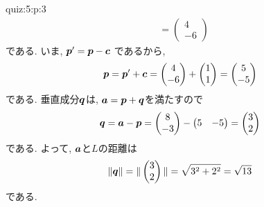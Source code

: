 \begin{answerof}{quiz:5:p:3}
\begin{align*}
  &=\begin{pmatrix}4\\-6\end{pmatrix}
  \end{align*}
  である.
  いま, $\boldsymbol{p}'=\boldsymbol{p}-\boldsymbol{c}$
  であるから,
  \begin{align*}
    \boldsymbol{p}=\boldsymbol{p}'+\boldsymbol{c}=\begin{pmatrix}4\\-6\end{pmatrix}+\begin{pmatrix}1\\1\end{pmatrix}=\begin{pmatrix}5\\-5\end{pmatrix}
  \end{align*}
  である.  
  垂直成分$\boldsymbol{q}$は,
  $\boldsymbol{a}=\boldsymbol{p}+\boldsymbol{q}$を満たすので
  \begin{align*}
    \boldsymbol{q}=\boldsymbol{a}-\boldsymbol{p}
    =\begin{pmatrix}8\\-3\end{pmatrix}-\begin{pmatrix}5&-5\end{pmatrix}
    =\begin{pmatrix}3\\2\end{pmatrix}
  \end{align*}
  である.
  よって, $\boldsymbol{a}$と$L$の距離は
  \begin{align*}
    \|\boldsymbol{q}\|= \|\begin{pmatrix}3\\2\end{pmatrix}\|=\sqrt{3^2+2^2}=\sqrt{13}
  \end{align*}
  である.


\end{answerof}
